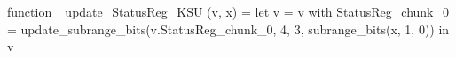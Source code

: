 function _update_StatusReg_KSU (v, x) = let v = { v with StatusReg_chunk_0 = update_subrange_bits(v.StatusReg_chunk_0, 4, 3, subrange_bits(x, 1, 0)) } in
  v
